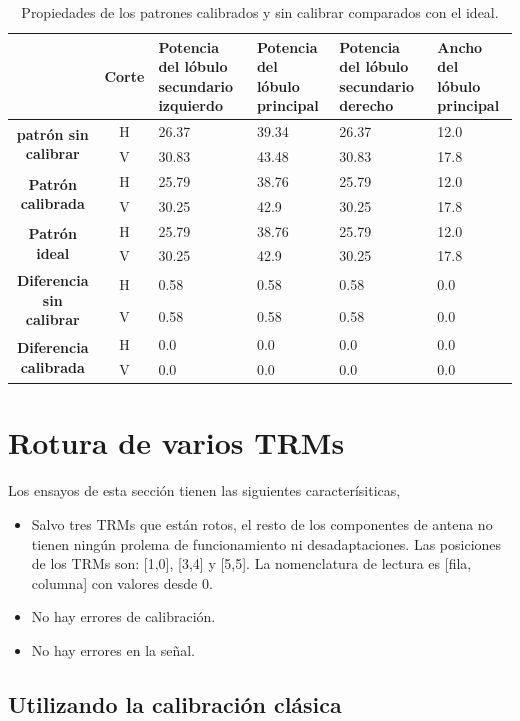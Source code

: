 \begin{table}[H]
  \footnotesize
  \centering
  \begin{tabular}{|c|c|p{2cm}|p{2cm}|p{2cm}|p{2cm}|}
    \cline{2-6}
    \multicolumn{1}{c|}{} & \textbf{Corte} & \textbf{Potencia del lóbulo secundario izquierdo} & \textbf{Potencia del lóbulo principal} &
    \textbf{Potencia del lóbulo secundario derecho} & \textbf{Ancho del lóbulo principal} \tabularnewline\hline
    \multirow{2}{*}{\textbf{patrón sin calibrar}} & H & 26.37 & 39.34 & 26.37 & 12.0 \tabularnewline\cline{2-6}
     & V & 30.83 & 43.48 & 30.83 & 17.8 \tabularnewline\hline
    \multirow{2}{*}{\textbf{Patrón calibrada}} & H & 25.79 & 38.76 & 25.79 & 12.0 \tabularnewline\cline{2-6}
     & V & 30.25 & 42.9 & 30.25 & 17.8 \tabularnewline\hline
    \multirow{2}{*}{\textbf{Patrón ideal}} & H & 25.79 & 38.76 & 25.79 & 12.0 \tabularnewline\cline{2-6}
     & V & 30.25 & 42.9 & 30.25 & 17.8 \tabularnewline\hline
    \multirow{2}{*}{\textbf{Diferencia sin calibrar}} & H & 0.58 & 0.58 & 0.58 & 0.0\tabularnewline\cline{2-6}
     & V & 0.58 & 0.58 & 0.58 & 0.0 \tabularnewline\hline
    \multirow{2}{*}{\textbf{Diferencia calibrada}} & H & 0.0 & 0.0 & 0.0 & 0.0 \tabularnewline\cline{2-6}
     & V & 0.0 & 0.0 & 0.0 & 0.0 \tabularnewline\hline
  \end{tabular}
  \caption{Propiedades de los patrones calibrados y sin calibrar comparados con el ideal.}
  \label{tab:nonErrMutual10degRow}
\end{table}



\section{Rotura de varios TRMs}
Los ensayos de esta sección tienen las siguientes caracterísiticas,
\begin{itemize}
	\item Salvo tres TRMs que están rotos, el resto de los componentes de antena no tienen ningún prolema de funcionamiento ni 
		desadaptaciones. Las posiciones de los TRMs son: [1,0], [3,4] y [5,5]. La nomenclatura de lectura es [fila, columna] con 
		valores desde 0.
	\item No hay errores de calibración.
	\item No hay errores en la señal.
\end{itemize}

\subsection{Utilizando la calibración clásica}

